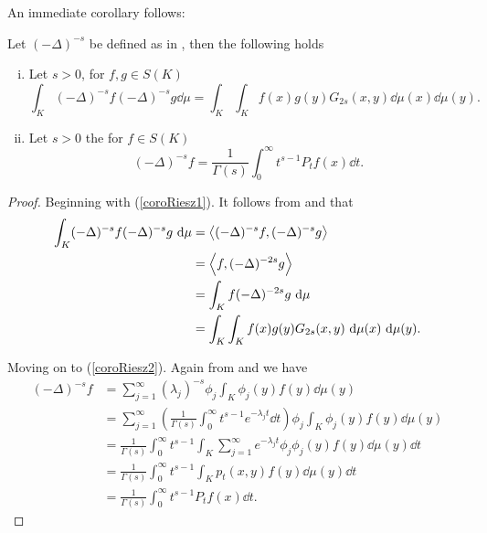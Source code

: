 An immediate corollary follows:
\begin{coro}\label{coro:ForRieszKernelAndFractionalLaplacian} Let $(-\Delta)^{-s}$ be defined as in , then the following holds
	\begin{enumerate}[(i)]
		\item 	Let $s > 0$, for $f,g \in S(K)$ \label{coroRiesz1}
		\begin{equation}
			\int_{K} (-\Delta)^{-s} f (-\Delta)^{-s} g \dd \mu = \int_{K}\int_{K} f(x)g(y)G_{2s}(x,y) \dd \mu(x) \dd \mu (y).
		\end{equation}
		
		\item Let $s > 0$ the for $f \in S(K)$\label{coroRiesz2}
		\begin{equation}
			(-\Delta)^{-s}f = \frac{1}{\Gamma(s)}\int_{0}^{\infty} t^{s-1}P_tf(x) \dd t.
		\end{equation}
	\end{enumerate}

\end{coro}
\begin{proof}
	Beginning with (\ref{coroRiesz1}). It follows from  and  that
	\begin{align}
		\int_{K} (-\Delta)^{-s}f (-\Delta)^{-s}g \ \text{d} \mu &= \left\langle (-\Delta)^{-s}f, (-\Delta)^{-s}g \right\rangle \\
		& = \left\langle f, (-\Delta)^{-2s}g \right\rangle\\
		 & = \int_{K}f (-\Delta)^{-2s}g \ \text{d} \mu \\
		 & =\int_{K}\int_{K} f(x)g(y)G_{2s}(x,y) \ \text{d} \mu(x) \ \text{d} \mu (y).
	\end{align}
	
	Moving on to (\ref{coroRiesz2}). Again from  and  we have
	\begin{align}
		(-\Delta)^{-s}f &= \sum_{j =1 }^{\infty} (\lambda_j)^{-s} \phi_j \int_{K}\phi_j(y) f(y) \dd \mu(y) \\
		&= \sum_{j =1 }^{\infty} \left(\frac{1}{\Gamma(s)} \int_{0}^{\infty} t^{s-1}e^{-\lambda_j t} \dd t\right) \phi_j \int_{K}\phi_j(y) f(y) \dd \mu(y) \\
		&= \frac{1}{\Gamma(s)} \int_{0}^{\infty} t^{s-1} \int_{K} \sum_{j = 1}^{\infty}  e^{-\lambda_j t}  \phi_j \phi_j(y) f(y) \dd \mu(y) \dd t \\
		&= \frac{1}{\Gamma(s)} \int_{0}^{\infty} t^{s-1} \int_{K} p_t(x,y) f(y) \dd \mu(y) \dd t \\
		&=\frac{1}{\Gamma(s)} \int_{0}^{\infty} t^{s-1} P_tf(x) \dd t.
	\end{align}
\end{proof}